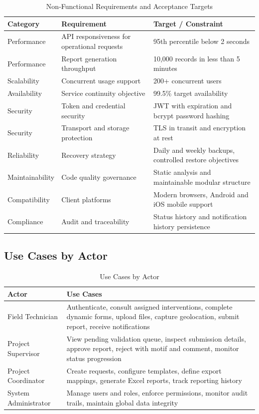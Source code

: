 \begin{table}[H]
\centering
\caption{Non-Functional Requirements and Acceptance Targets}
\label{tab:nfr_targets}
\begin{tabularx}{\textwidth}{|l|X|X|}
\hline
\textbf{Category} & \textbf{Requirement} & \textbf{Target / Constraint} \\
\hline
Performance & API responsiveness for operational requests & 95th percentile below 2 seconds \\
\hline
Performance & Report generation throughput & 10,000 records in less than 5 minutes \\
\hline
Scalability & Concurrent usage support & 200+ concurrent users \\
\hline
Availability & Service continuity objective & 99.5\% target availability \\
\hline
Security & Token and credential security & JWT with expiration and bcrypt password hashing \\
\hline
Security & Transport and storage protection & TLS in transit and encryption at rest \\
\hline
Reliability & Recovery strategy & Daily and weekly backups, controlled restore objectives \\
\hline
Maintainability & Code quality governance & Static analysis and maintainable modular structure \\
\hline
Compatibility & Client platforms & Modern browsers, Android and iOS mobile support \\
\hline
Compliance & Audit and traceability & Status history and notification history persistence \\
\hline
\end{tabularx}
\end{table}

\subsection{Use Cases by Actor}

\begin{table}[H]
\centering
\caption{Use Cases by Actor}
\label{tab:usecases_by_actor_detailed}
\begin{tabularx}{\textwidth}{|l|X|}
\hline
\textbf{Actor} & \textbf{Use Cases} \\
\hline
Field Technician & Authenticate, consult assigned interventions, complete dynamic forms, upload files, capture geolocation, submit report, receive notifications \\
\hline
Project Supervisor & View pending validation queue, inspect submission details, approve report, reject with motif and comment, monitor status progression \\
\hline
Project Coordinator & Create requests, configure templates, define export mappings, generate Excel reports, track reporting history \\
\hline
System Administrator & Manage users and roles, enforce permissions, monitor audit trails, maintain global data integrity \\
\hline
\end{tabularx}
\end{table}

